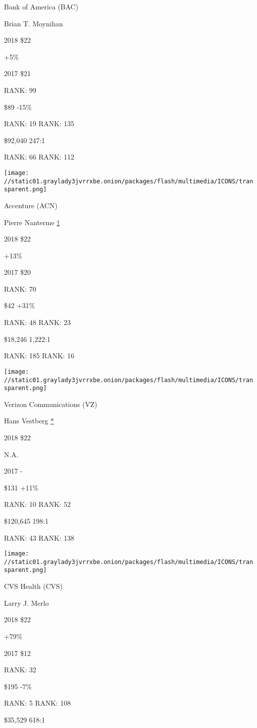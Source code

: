 Bank of America (BAC)

Brian T. Moynihan \protect\hyperlink{g-footnotes}{}

2018 \$22

 +5\%

2017 \$21

RANK: 99

 \$89 -15\%

RANK: 19 RANK: 135

 \$92,040 247:1

RANK: 66 RANK: 112

\texttt{[image: //static01.graylady3jvrrxbe.onion/packages/flash/multimedia/ICONS/transparent.png]}

Accenture (ACN)

Pierre Nanterme \protect\hyperlink{g-footnotes}{†}

2018 \$22

 +13\%

2017 \$20

RANK: 70

 \$42 +31\%

RANK: 48 RANK: 23

 \$18,246 1,222:1

RANK: 185 RANK: 16

\texttt{[image: //static01.graylady3jvrrxbe.onion/packages/flash/multimedia/ICONS/transparent.png]}

Verizon Communications (VZ)

Hans Vestberg \protect\hyperlink{g-footnotes}{*}

2018 \$22

 N.A.

2017 -

 \$131 +11\%

RANK: 10 RANK: 52

 \$120,645 198:1

RANK: 43 RANK: 138

\texttt{[image: //static01.graylady3jvrrxbe.onion/packages/flash/multimedia/ICONS/transparent.png]}

CVS Health (CVS)

Larry J. Merlo \protect\hyperlink{g-footnotes}{}

2018 \$22

 +79\%

2017 \$12

RANK: 32

 \$195 -7\%

RANK: 5 RANK: 108

 \$35,529 618:1

